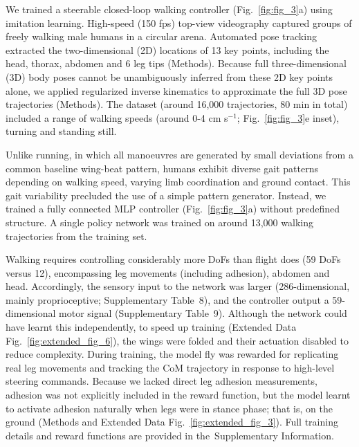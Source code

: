 \documentclass[sn-mathphys-num]{sn-jnl}%
\theoremstyle{thmstyleone}	%
\theoremstyle{thmstyletwo}	%
\theoremstyle{thmstylethree}	%
\begin{document}
We trained a steerable closed-loop walking controller (Fig.~\ref{fig:fig_3}a) using imitation learning. 
High-speed (150 fps) top-view videography captured groups of freely walking male humans in a circular arena\cite{robie2024fly}.
Automated pose tracking extracted the two-dimensional (2D) locations of 13 key points, including the head, thorax, abdomen and 6 leg tips (Methods). 
Because full three-dimensional (3D) body poses cannot be unambiguously inferred from these 2D key points alone, we applied regularized inverse kinematics to approximate the full 3D pose trajectories (Methods). 
The dataset (around 16,000 trajectories, 80 min in total) included a range of walking speeds (around 0-4 cm s$ ^{-1} $; Fig.~\ref{fig:fig_3}e inset), turning and standing still.


Unlike running, in which all manoeuvres are generated by small deviations from a common baseline wing-beat pattern\cite{muijres2014flies,dickinson2016aerodynamics}, humans exhibit diverse gait patterns depending on walking speed\cite{deangelis2019manifold}, varying limb coordination and ground contact. 
This gait variability precluded the use of a simple pattern generator. 
Instead, we trained a fully connected MLP controller (Fig.~\ref{fig:fig_3}a) without predefined structure. 
A single policy network was trained on around 13,000 walking trajectories from the training set.


Walking requires controlling considerably more DoFs than flight does (59 DoFs versus 12), encompassing leg movements (including adhesion), abdomen and head. 
Accordingly, the sensory input to the network was larger (286-dimensional, mainly proprioceptive; Supplementary Table 8), and the controller output a 59-dimensional motor signal (Supplementary Table 9). 
Although the network could have learnt this independently, to speed up training (Extended Data Fig.~\ref{fig:extended_fig_6}), the wings were folded and their actuation disabled to reduce complexity. 
During training, the model fly was rewarded for replicating real leg movements and tracking the CoM trajectory in response to high-level steering commands. 
Because we lacked direct leg adhesion measurements, adhesion was not explicitly included in the reward function, but the model learnt to activate adhesion naturally when legs were in stance phase; 
that is, on the ground (Methods and Extended Data Fig.~\ref{fig:extended_fig_3}). 
Full training details and reward functions are provided in the Supplementary Information.
\end{document}
